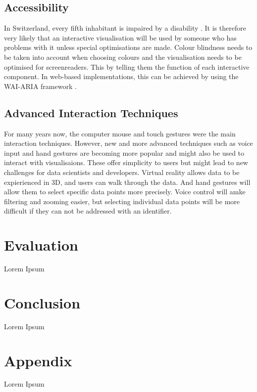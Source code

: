 \documentclass[11pt]{article}
\begin{document}
\subsection{Accessibility}

In Switzerland, every fifth inhabitant is impaired by a disability \parencite{federal_statistical_office_persons_2019}. It is therefore very likely that an interactive visualisation will be used by someone who has problems with it unless special optimisations are made. Colour blindness needs to be taken into account when choosing colours and the visualisation needs to be optimised for screenreaders. This by telling them the function of each interactive component. In web-based implementations, this can be achieved by using the WAI-ARIA framework \parencite{nurthen_wai-aria_2022}.

\subsection{Advanced Interaction Techniques}

For many years now, the computer mouse and touch gestures were the main interaction techniques. However, new and more advanced techniques such as voice input and hand gestures are becoming more popular and might also be used to interact with visualisaions. These offer simplicity to users but might lead to new challenges for data scientists and developers. Virtual reality allows data to be expierienced in 3D, and users can walk through the data. And hand gestures will allow them to select specific data points more precisely. Voice control will amke filtering and zooming easier, but selecting individual data points will be more difficult if they can not be addressed with an identifier.

\pagebreak
\section{Evaluation}
Lorem Ipsum

\section{Conclusion}
Lorem Ipsum

\pagebreak
\section{Appendix}
Lorem Ipsum

\pagebreak
\printbibliography
\end{document}
